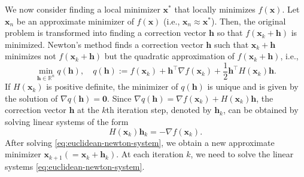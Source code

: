 {We now consider finding a local minimizer $\boldsymbol{x}^*$ that locally minimizes $f(\boldsymbol{x})$. Let $\boldsymbol{x}_n$ be an approximate minimizer of $f(\boldsymbol{x})$ (i.e., $\boldsymbol{x}_n\approx\boldsymbol{x}^*$). Then, the original problem is transformed into finding a correction vector $\boldsymbol{h}$ so that $f(\boldsymbol{x}_k+\boldsymbol{h})$ is minimized.}
{Newton's method finds a correction vector $\boldsymbol{h}$ such that $\boldsymbol{x}_k+\boldsymbol{h}$ minimizes not $f(\boldsymbol{x}_k+\boldsymbol{h})$ but the quadratic approximation of $f(\boldsymbol{x}_k+\boldsymbol{h})$, i.e.,}
\[\min_{\boldsymbol{h}\in\mathbb{R}^n}q(\boldsymbol{h}),\quad q(\boldsymbol{h}):=f(\boldsymbol{x}_k)+\boldsymbol{h}^{\top}\nabla f(\boldsymbol{x}_k)+\frac12\boldsymbol{h}^{\top}H(\boldsymbol{x}_k)\boldsymbol{h}.\]
{If $H(\boldsymbol{x}_k)$ is positive definite, the minimizer of $q(\boldsymbol{h})$ is unique and is given by the solution of $\nabla q(\boldsymbol{h})=\boldsymbol{0}$. Since $\nabla q(\boldsymbol{h})=\nabla f(\boldsymbol{x}_k)+H(\boldsymbol{x}_k)\boldsymbol{h}$, the correction vector $\boldsymbol{h}$ at the $k$th iteration step, denoted by $\boldsymbol{h}_k$, can be obtained by solving linear systems of the form}
\begin{equation}\label{eq:euclidean-newton-system}
H(\boldsymbol{x}_k)\boldsymbol{h}_k=-\nabla f(\boldsymbol{x}_k).
\end{equation}
{After solving \eqref{eq:euclidean-newton-system}, we obtain a new approximate minimizer $\boldsymbol{x}_{k+1}(=\boldsymbol{x}_k+\boldsymbol{h}_k)$. At each iteration $k$, we need to solve the linear systems \eqref{eq:euclidean-newton-system}.}
